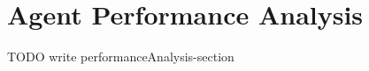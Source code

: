 \section{Agent Performance Analysis}\label{sec:performanceAnalysis}

TODO write performanceAnalysis-section